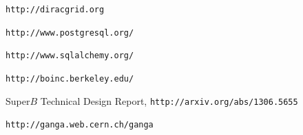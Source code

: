 \documentclass[a4paper]{jpconf}
\begin{document}
\begin{thebibliography}{30}





\verb"http://diracgrid.org"

\verb"http://www.postgresql.org/"

\verb"http://www.sqlalchemy.org/"

\verb"http://boinc.berkeley.edu/"

Super$B$ Technical Design Report, \verb"http://arxiv.org/abs/1306.5655"




\verb"http://ganga.web.cern.ch/ganga"







\end{thebibliography}
\end{document}
